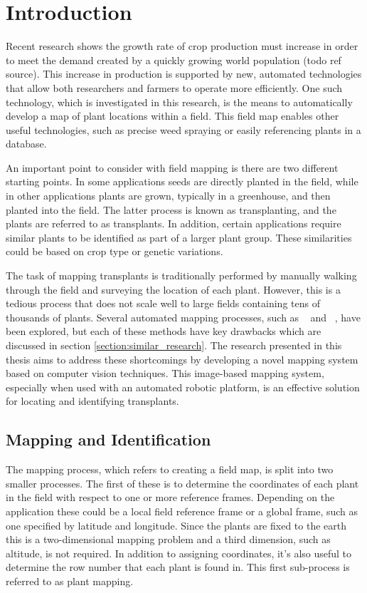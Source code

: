 
\cleardoublepage

\chapter{Introduction}
\label{introduction}

Recent research shows the growth rate of crop production must increase in order to meet the demand created by a quickly growing world population (todo ref source).  This increase in production is supported by new, automated technologies that allow both researchers and farmers to operate more efficiently.  One such technology, which is investigated in this research, is the means to automatically develop a map of plant locations within a field.  This field map enables other useful technologies, such as precise weed spraying or easily referencing plants in a database. 
 
An important point to consider with field mapping is there are two different starting points.  In some applications seeds are directly planted in the field, while in other applications plants are grown, typically in a greenhouse, and then planted into the field.  The latter process is known as transplanting, and the plants are referred to as transplants.  In addition, certain applications require similar plants to be identified as part of a larger plant group.  These similarities could be based on crop type or genetic variations. 

The task of mapping transplants is traditionally performed by manually walking through the field and surveying the location of each plant. However, this is a tedious process that does not scale well to large fields containing tens of thousands of plants.  Several automated mapping processes, such as ~\citep{Perez-Ruiz:2012} and ~\citep{Soille:2000}, have been explored, but each of these methods have key drawbacks which are discussed in section \ref{section:similar_research}.  The research presented in this thesis aims to address these shortcomings by developing a novel mapping system based on computer vision techniques.  This image-based mapping system, especially when used with an automated robotic platform, is an effective solution for locating and identifying transplants. 

\section{Mapping and Identification}

The mapping process, which refers to creating a field map, is split into two smaller processes.  The first of these is to determine the coordinates of each plant in the field with respect to one or more reference frames.  Depending on the application these could be a local field reference frame or a global frame, such as one specified by latitude and longitude.  Since the plants are fixed to the earth this is a two-dimensional mapping problem and a third dimension, such as altitude, is not required.  In addition to assigning coordinates, it's also useful to determine the row number that each plant is found in.  This first sub-process is referred to as plant mapping. 

